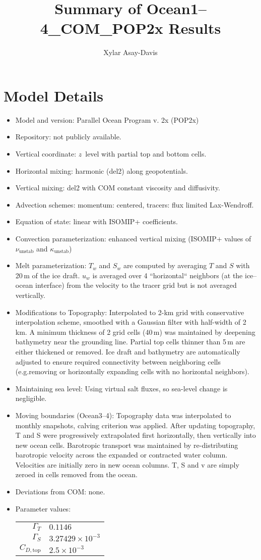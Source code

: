 \documentclass[11pt]{article} %
\title{Summary of Ocean1--4\_COM\_POP2x Results}
\author{Xylar Asay-Davis}
\begin{document}
\maketitle

\section{Model Details}

\begin{itemize}
\item Model and version: Parallel Ocean Program v. 2x (POP2x)
\item Repository: not publicly available.
\item Vertical coordinate: $z$~level with partial top and bottom cells.
\item Horizontal mixing: harmonic (del2) along geopotentials.
\item Vertical mixing: del2 with COM constant viscosity and diffusivity.
\item Advection schemes: momentum: centered, tracers: flux limited Lax-Wendroff.
\item Equation of state: linear with ISOMIP+ coefficients.
\item Convection parameterization: enhanced vertical mixing (ISOMIP+ values of $\nu_\textrm{unstab}$ and 
$\kappa_\textrm{unstab}$)
\item Melt parameterization: $T_w$ and $S_w$ are computed by averaging $T$ and $S$ with 20\,m of the ice
draft.  $u_w$ is averaged over 4 ``horizontal`` neighbors (at the ice--ocean interface) from the velocity to the tracer 
grid but is not averaged vertically.
\item Modifications to Topography: Interpolated to 2-km grid with conservative interpolation scheme, 
smoothed with a Gaussian filter with half-width of 2\,km.  A minimum thickness of 2 grid cells (40\,m) was 
maintained by deepening bathymetry near the grounding line.  Partial top cells thinner than 5\,m are either 
thickened or removed.  Ice draft and bathymetry are automatically adjusted to ensure required connectivity 
between neighboring cells (e.g.removing or horizontally expanding cells with no horizontal neighbors).
\item Maintaining sea level: Using virtual salt fluxes, so sea-level change is negligible. 
\item Moving boundaries (Ocean3--4): Topography data was interpolated to monthly snapshots, calving criterion
was applied.  After updating topography, T and S were progressively extrapolated first horizontally, then 
vertically into new ocean cells.  Barotropic transport was maintained by re-distributing barotropic velocity across 
the expanded or contracted water column.  Velocities are initially zero in new ocean columns.  T, S and v are simply 
zeroed in cells removed from the ocean.
\item Deviations from COM: none.
\item Parameter values:

\begin{tabular}{rl}
$\Gamma_T$ & $0.1146$ \\
$\Gamma_S$ & $3.27429 \times 10^{-3}$ \\
$C_{D,\textrm{top}}$ & $2.5 \times 10^{-3}$
\end{tabular}
\end{itemize}
\end{document}

